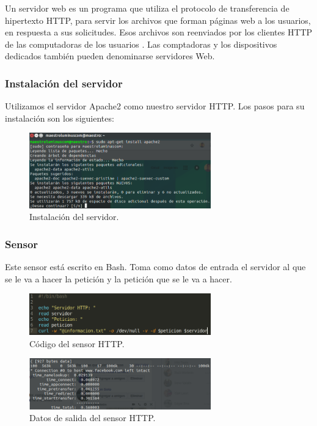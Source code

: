 Un servidor web es un programa que utiliza el protocolo de transferencia de hipertexto HTTP, para servir los archivos que forman páginas web a los usuarios, en respuesta a sus solicitudes. Esos archivos son reenviados por los clientes HTTP de las computadoras de los usuarios . Las comptadoras y los dispositivos dedicados también pueden denominarse servidores Web.
\subsubsection{Instalación del servidor}
Utilizamos el servidor Apache2 como nuestro servidor HTTP. Los pasos para su instalación son los siguientes:
\begin{figure}[!htbp]
	\hypertarget{fig:instalacionHTTP}{\hspace{1pt}}
	\begin{center}
		\includegraphics[width=0.7\textwidth]{desarrollo/tarea2/img/instalacionHTTP.png}
		\caption{Instalación del servidor.}
		\label{fig:instalacionHTTP}
	\end{center}
\end{figure}
\subsubsection{Sensor}
Este sensor está escrito en Bash. Toma como datos de entrada el servidor al que se le va a hacer la petición y la petición que se le va a hacer.
\begin{figure}[!htbp]
	\hypertarget{fig:sensorHTTP}{\hspace{1pt}}
	\begin{center}
		\includegraphics[width=0.7\textwidth]{desarrollo/tarea2/img/sensorHTTP.png}
		\caption{Código del sensor HTTP.}
		\label{fig:sensorHTTP}
	\end{center}
\end{figure}
\pagebreak
\begin{figure}[!htbp]
	\hypertarget{fig:outputHTTP}{\hspace{1pt}}
	\begin{center}
		\includegraphics[width=0.7\textwidth]{desarrollo/tarea2/img/outputHTTP.png}
		\caption{Datos de salida del sensor HTTP.}
		\label{fig:outputHTTP}
	\end{center}
\end{figure}